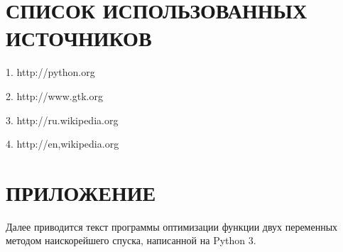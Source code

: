\section*{СПИСОК ИСПОЛЬЗОВАННЫХ ИСТОЧНИКОВ}
1. http://python.org

2. http://www.gtk.org

3. http://ru.wikipedia.org

4. http://en,wikipedia.org
\section*{ПРИЛОЖЕНИЕ}
Далее приводится текст программы оптимизации функции двух переменных методом наискорейшего спуска, написанной на Python 3.

